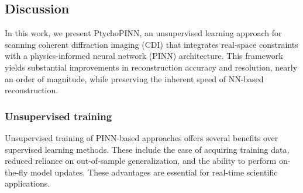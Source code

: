 \documentclass[sn-mathphys]{sn-jnl}%
\theoremstyle{thmstyleone}%
\theoremstyle{thmstyletwo}%
\theoremstyle{thmstylethree}%
\begin{document}
%
%

\subsection{Discussion}
In this work, we present PtychoPINN, an unsupervised learning approach for scanning coherent diffraction imaging (CDI) that integrates real-space constraints with a physics-informed neural network (PINN) architecture. This framework yields substantial improvements in reconstruction accuracy and resolution, nearly an order of magnitude, while preserving the inherent speed of NN-based reconstruction.

\subsubsection{Unsupervised training}
Unsupervised training of PINN-based approaches offers several benefits over supervised learning methods. These include the ease of acquiring training data, reduced reliance on out-of-sample generalization, and the ability to perform on-the-fly model updates. These advantages are essential for real-time scientific applications.
\end{document}
